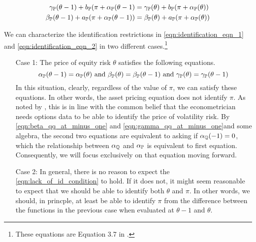 \documentclass[11pt, letterpaper, twoside, final]{article}
\begin{document}
\begin{align}
   \label{eqn:identification_eqn_1}
   \gamma_{\mathbb{P}}(\theta-1) + b_{\mathbb{P}}(\pi + \alpha_{\mathbb{P}}(\theta - 1)  &= \gamma_{\mathbb{P}}(\theta) + b_{\mathbb{P}}(\pi +
    \alpha_{\mathbb{P}}(\theta))  \\
    \label{eqn:identification_eqn_2}
    \beta_{\mathbb{P}}(\theta-1) + a_{\mathbb{P}}(\pi + \alpha_{\mathbb{P}}(\theta -1)) &= \beta_{\mathbb{P}}(\theta) +
        a_{\mathbb{P}}(\pi + \alpha_{\mathbb{P}}(\theta)) 
\end{align}

We can characterize the identification restrictions in \cref{eqn:identification_eqn_1} and
\cref{eqn:identification_eqn_2} in two different cases.\footnote{These equations are Equation 3.7 in
\textcite{khrapov2016affine}.}

\begin{enumerate}
    \item[Case 1:] The price of equity risk $\theta$ satisfies the following equations. 
        \begin{equation}
            \alpha_{\PP}(\theta - 1) = \alpha_{\PP}(\theta)\ \text{and}\ \beta_{\PP}(\theta) = \beta_{\PP}(\theta
            -1)\ \text{and}\ \gamma_{\PP}(\theta) = \gamma_{\PP}(\theta - 1)
            \label{eqn:lack_of_id_condition}
        \end{equation}
        In this situation, clearly, regardless of the value of $\pi$, we can satisfy these equations.
        In other words, the asset pricing equation does not identify $\pi$. 
        As noted by \textcite{khrapov2016affine}, this is in line with the common belief that the econometrician
        needs options data to be able to identify the price of volatility risk. 
        By \cref{eqn:beta_qq_at_minus_one} and \cref{eqn:gamma_qq_at_minus_one}and some algebra, the second two
        equations are equivalent to asking if $\alpha_{\mathbb{Q}}(-1) = 0$, which the relationship between
        $\alpha_{\mathbb{Q}}$ and $\alpha_{\mathbb{P}}$ is equivalent to first equation.
        Consequently, we will focus exclusively on that equation moving forward.

    \item[Case 2:] 
        In general, there is no reason to expect the \cref{eqn:lack_of_id_condition} to hold.
        If it does not, it might seem reasonable to expect that we should be able to identify both $\theta$ and
        $\pi$.
        In other words, we should, in princple, at least be able to identify $\pi$ from the difference between the
        functions in the previous case when evaluated at $\theta-1$ and $\theta$.
\end{enumerate}
\end{document}
